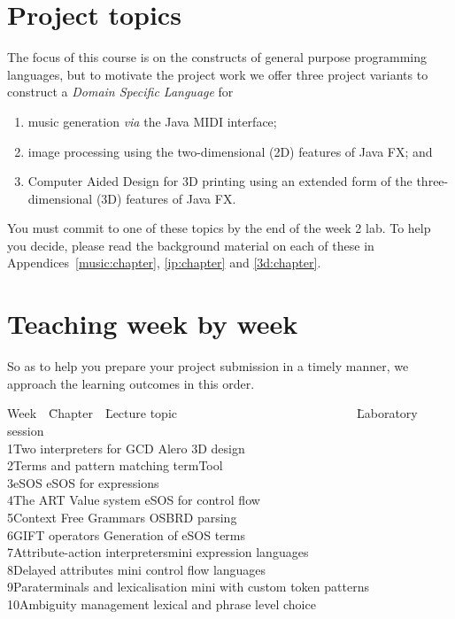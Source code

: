 \documentclass[11pt]{book}
\begin{document}
\section{Project topics}
The focus of this course is on the constructs of general purpose programming languages, but to motivate the project work we offer three project variants to construct a {\em Domain Specific Language} for 
\begin{enumerate}
\item music generation {\em via} the Java MIDI interface;
\item image processing using the two-dimensional (2D) features of Java FX; and
\item Computer Aided Design for 3D printing using an extended form of the three-dimensional (3D) features of Java FX.
\end{enumerate}
You must commit to one of these topics by the end of the week 2 lab. To help you decide, please read the background material on each of these in Appendices~\ref{music:chapter}, \ref{ip:chapter} and \ref{3d:chapter}.


\section{Teaching week by week}
So as to help you prepare your project submission in a timely manner, we approach the learning outcomes in this order.
\begin{tabbing}
Week~~\=Chapter~~\=Lecture topic~~~~~~~~~~~~~~~~~~~~~~~~~~~~~\=Laboratory session\\[1ex]
1\>Two interpreters for GCD\> Alero 3D design\\
2\>Terms and pattern matching\> termTool \\
3\>eSOS\> eSOS for expressions\\
4\>The ART Value system\> eSOS for control flow\\
5\>Context Free Grammars\> OSBRD parsing\\
6\>GIFT operators\> Generation of eSOS terms\\
7\>Attribute-action interpreters\>mini expression languages \\
8\>Delayed attributes\> mini control flow languages\\
9\>Paraterminals and lexicalisation\> mini with custom token patterns\\
10\>Ambiguity management\> lexical and phrase level choice\\
\end{tabbing}
\end{document}
